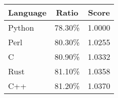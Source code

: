 \centering
\begin{tabular}{|l|c|c|}
    \hline
    Language & Ratio & Score \\
    \hline
    Python & 78.30\% & 1.0000 \\
    Perl & 80.30\% & 1.0255 \\
    C & 80.90\% & 1.0332 \\
    Rust & 81.10\% & 1.0358 \\
    C++ & 81.20\% & 1.0370 \\
    \hline
\end{tabular}
